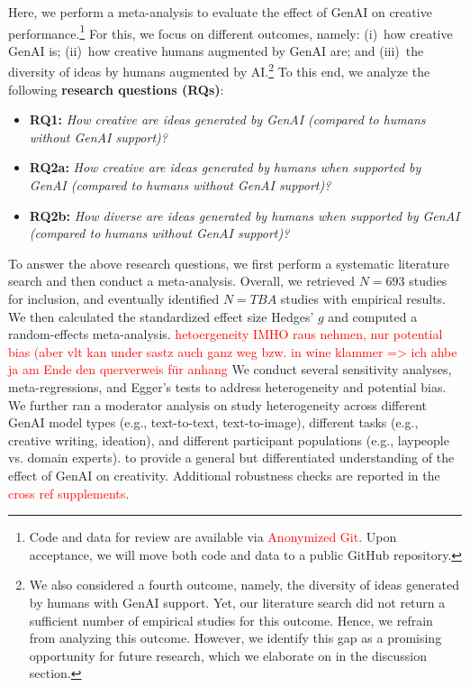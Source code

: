 \documentclass[manuscript, screen, review, acmsmall, anonymous]{acmart}
\newcommand{\TODO}[1]{\textcolor{red}{#1}}
\begin{document}
Here, we perform a meta-analysis to evaluate the effect of GenAI on creative performance.\footnote{Code and data for review are available via \TODO{Anonymized Git}. Upon acceptance, we will move both code and data to a public GitHub repository.} For this, we focus on different outcomes, namely: (i)~how creative GenAI is; (ii)~how creative humans augmented by GenAI are; and (iii)~the diversity of ideas by humans augmented by AI.\footnote{We also considered a fourth outcome, namely, the diversity of ideas generated by humans with GenAI support. Yet, our literature search did not return a sufficient number of empirical studies for this outcome. Hence, we refrain from analyzing this outcome. However, we identify this gap as a promising opportunity for future research, which we elaborate on in the discussion section.} To this end, we analyze the following \textbf{research questions (RQs)}:

\begin{itemize}
\item \textbf{RQ1:} \textit{How creative are ideas generated by GenAI (compared to humans without GenAI support)?}
\item \textbf{RQ2a:} \textit{How creative are ideas generated by humans when supported by GenAI (compared to humans without GenAI support)?}
\item \textbf{RQ2b:} \textit{How diverse are ideas generated by humans when supported by GenAI (compared to humans without GenAI support)?}
\end{itemize}

\noindent
To answer the above research questions, we first perform a systematic literature search and then conduct a meta-analysis. Overall, we retrieved $N= 693$ studies for inclusion, and eventually identified $N = TBA$ studies with empirical results. We then calculated the standardized effect size Hedges' $g$ and computed a random-effects meta-analysis. \TODO{hetoergeneity IMHO raus nehmen, nur potential bias (aber vlt kan under sastz auch ganz weg bzw. in wine klammer => ich ahbe ja am Ende den querverweis für anhang }We conduct several sensitivity analyses, meta-regressions, and Egger’s tests to address heterogeneity and potential bias. We further ran a moderator analysis on study heterogeneity across different GenAI model types (e.g., text-to-text, text-to-image), different tasks (e.g., creative writing, ideation), and different participant populations (e.g., laypeople vs. domain experts). to provide a general but differentiated understanding of the effect of GenAI on creativity. Additional robustness checks are reported in the \TODO{cross ref supplements}.
\end{document}
